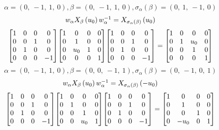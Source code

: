 \documentclass[11pt]{article}
\theoremstyle{definition}
\begin{document}
\[
\alpha = \left( 0, \  -1, \  1, \  0\right), \beta = \left( 0, \  -1, \  1, \  0\right), \sigma_{\alpha}(\beta) = \left( 0, \  1, \  -1, \  0\right)
\]
\[
\scaletoalign{\textwidth}{w_{\alpha} X_{\beta}\left(u_{0}\right) w_{\alpha}^{-1} = X_{\sigma_{\alpha}\left(\beta\right)}\left(u_{0}\right)}
\]
\[
\scaletoalign{\textwidth}{{\left[\begin{matrix}1 & 0 & 0 & 0\\0 & 0 & 1 & 0\\0 & 1 & 0 & 0\\0 & 0 & 0 & -1\end{matrix}\right]} {\left[\begin{matrix}1 & 0 & 0 & 0\\0 & 1 & 0 & 0\\0 & u_{0} & 1 & 0\\0 & 0 & 0 & 1\end{matrix}\right]} {\left[\begin{matrix}1 & 0 & 0 & 0\\0 & 0 & 1 & 0\\0 & 1 & 0 & 0\\0 & 0 & 0 & -1\end{matrix}\right]} = {\left[\begin{matrix}1 & 0 & 0 & 0\\0 & 1 & u_{0} & 0\\0 & 0 & 1 & 0\\0 & 0 & 0 & 1\end{matrix}\right]}}
\]
\[
\alpha = \left( 0, \  -1, \  1, \  0\right), \beta = \left( 0, \  0, \  -1, \  1\right), \sigma_{\alpha}(\beta) = \left( 0, \  -1, \  0, \  1\right)
\]
\[
\scaletoalign{\textwidth}{w_{\alpha} X_{\beta}\left(u_{0}\right) w_{\alpha}^{-1} = X_{\sigma_{\alpha}\left(\beta\right)}\left(- u_{0}\right)}
\]
\[
\scaletoalign{\textwidth}{{\left[\begin{matrix}1 & 0 & 0 & 0\\0 & 0 & 1 & 0\\0 & 1 & 0 & 0\\0 & 0 & 0 & -1\end{matrix}\right]} {\left[\begin{matrix}1 & 0 & 0 & 0\\0 & 1 & 0 & 0\\0 & 0 & 1 & 0\\0 & 0 & u_{0} & 1\end{matrix}\right]} {\left[\begin{matrix}1 & 0 & 0 & 0\\0 & 0 & 1 & 0\\0 & 1 & 0 & 0\\0 & 0 & 0 & -1\end{matrix}\right]} = {\left[\begin{matrix}1 & 0 & 0 & 0\\0 & 1 & 0 & 0\\0 & 0 & 1 & 0\\0 & - u_{0} & 0 & 1\end{matrix}\right]}}
\]
\end{document}
